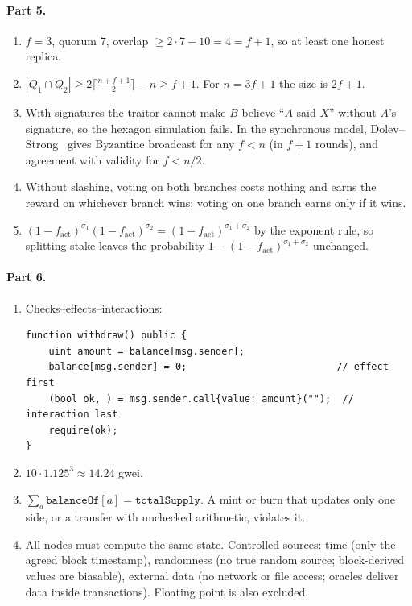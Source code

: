 \documentclass[11pt,a4paper]{article}
\theoremstyle{definition}
\theoremstyle{plain}
\theoremstyle{remark}
\begin{document}
\paragraph{Part 5.}
\begin{enumerate}[nosep,leftmargin=1.5em]
\item $f=3$, quorum $7$, overlap $\ge2\cdot7-10=4=f+1$, so at least one honest replica.
\item $|Q_1\cap Q_2|\ge2\lceil\frac{n+f+1}2\rceil-n\ge f+1$. For $n=3f+1$ the size is $2f+1$.
\item With signatures the traitor cannot make $B$ believe ``$A$ said $X$'' without $A$'s signature, so the hexagon simulation fails. In the synchronous model, Dolev--Strong~\cite{DS83} gives Byzantine broadcast for any $f<n$ (in $f+1$ rounds), and agreement with validity for $f<n/2$.
\item Without slashing, voting on both branches costs nothing and earns the reward on whichever branch wins; voting on one branch earns only if it wins.
\item $(1-f_{\text{act}})^{\sigma_1}(1-f_{\text{act}})^{\sigma_2}=(1-f_{\text{act}})^{\sigma_1+\sigma_2}$ by the exponent rule, so splitting stake leaves the probability $1-(1-f_{\text{act}})^{\sigma_1+\sigma_2}$ unchanged.
\end{enumerate}

\paragraph{Part 6.}
\begin{enumerate}[nosep,leftmargin=1.5em]
\item Checks--effects--interactions:
\begin{lstlisting}[language=Solidity]
function withdraw() public {
    uint amount = balance[msg.sender];
    balance[msg.sender] = 0;                          // effect first
    (bool ok, ) = msg.sender.call{value: amount}("");  // interaction last
    require(ok);
}
\end{lstlisting}
\item $10\cdot1.125^3\approx14.24$ gwei.
\item $\sum_a\texttt{balanceOf}[a]=\texttt{totalSupply}$. A mint or burn that updates only one side, or a transfer with unchecked arithmetic, violates it.
\item All nodes must compute the same state. Controlled sources: time (only the agreed block timestamp), randomness (no true random source; block-derived values are biasable), external data (no network or file access; oracles deliver data inside transactions). Floating point is also excluded.
\end{enumerate}
\end{document}
